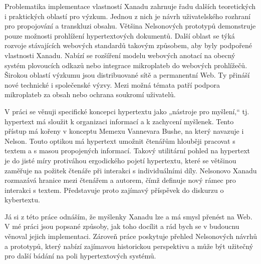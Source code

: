 Problematika implementace vlastností Xanadu zahrnuje řadu dalších teoretických i praktických oblastí pro výzkum.
Jednou z nich je návrh uživatelského rozhraní pro propojování a transkluzi obsahu. Většina Nelsonových prototypů demonstruje pouze možnosti prohlížení hypertextových dokumentů.
Další oblast se týká rozvoje stávajících webových standardů takovým způsobem, aby byly podpořené vlastnosti Xanadu. Nabízí se rozšíření modelu webových anotací na obecný systém plovoucích odkazů nebo integrace mikroplateb do webových prohlížečů.
Širokou oblastí výzkumu jsou distribuované sítě a permanentní Web. Ty přináší nové technické i společenské výzvy. Mezi možná témata patří podpora mikroplateb za obsah nebo ochrana soukromí uživatelů.

V práci se věnuji specifické koncepci hypertextu jako „nástroje pro myšlení,“ tj. hypertext má sloužit k organizaci informací a k zachycení myšlenek.
Tento přístup má kořeny v konceptu Memexu Vannevara Bushe, na který navazuje i Nelson. Touto optikou má hypertext umožnit čtenářům hlouběji pracovat s textem a s masou propojených informací.
Takový utilitární pohled na hypertext je do jisté míry protiváhou ergodického pojetí hypertextu, které se většinou zaměřuje na požitek čtenáře při interakci s individuálními díly. Nelsonovo Xanadu rozmazává hranice mezi čtenářem a autorem, čímž definuje nový rámec pro interakci s textem. Představuje proto zajímavý příspěvek do diskurzu o kybertextu.

Já si z této práce odnáším, že myšlenky Xanadu lze a má smysl přenést na Web. V mé práci jsou popsané způsoby, jak toho docílit a rád bych se v budoucnu věnoval jejich implementaci. Zároveň práce poskytuje přehled Nelsonových návrhů a prototypů, který nabízí zajímavou historickou perspektivu a může být užitečný pro další bádání na poli hypertextových systémů.